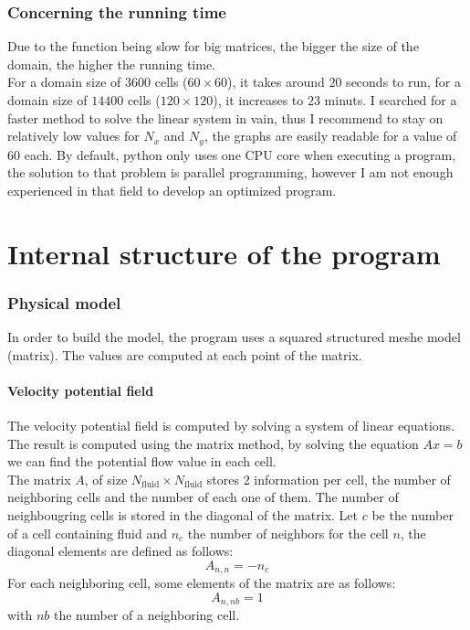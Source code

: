 \section{Concerning the running time}
Due to the function  being slow for
big matrices, the bigger the size of the domain, the higher the running time.\\
For a domain size of $\num{3600}$ cells ($\num{60} \times \num{60}$), it takes
around $\num{20}$ seconds to run, for a domain size of $\num{14400}$ cells
($\num{120} \times \num{120}$), it increases to $\num{23}$ minuts. 
\smallbreak{}
I searched for a faster method to solve the linear system in vain, thus I
recommend to stay on relatively low values for $N_x$ and $N_y$, the graphs are
easily readable for a value of $\num{60}$ each.
\smallbreak{}
By default, python only uses one CPU core when executing a program, the
solution to that problem is parallel programming, however I am not enough
experienced in that field to develop an optimized program.

\newpage
\part{Internal structure of the program}
\section{Physical model}
In order to build the model, the program uses a squared structured meshe
model (matrix). The values are computed at each point of the matrix.

\subsection{Velocity potential field}
The velocity potential field is computed by solving a system of linear
equations. The result is computed using the matrix method, by solving the
equation $Ax = b$ we can find the potential flow value in each cell.\\
The matrix $A$, of size $N_\text{fluid} \times N_\text{fluid}$ stores 2
information per cell, the number of neighboring cells and the number of each
one of them. The number of neighbougring cells is stored in the diagonal of the
 matrix. Let $c$ be the number of a cell containing fluid and $n_c$ the number
 of neighbors for the cell $n$, the diagonal elements are defined as follows:
\[
      A_{n, n} = -n_c
\]
For each neighboring cell, some elements of the matrix are as follows:
\[
      A_{n, nb} = 1
\]
with $nb$ the number of a neighboring cell.\\

